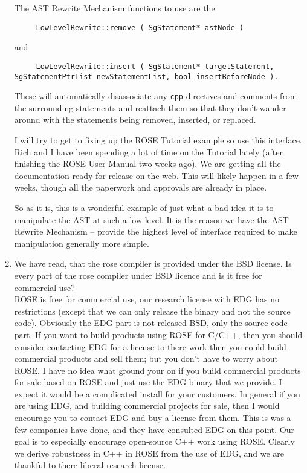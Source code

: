 \begin{enumerate}
The AST Rewrite Mechanism functions to use are the 
{\indent
{\mySmallFontSize
\begin{verbatim}
     LowLevelRewrite::remove ( SgStatement* astNode )
\end{verbatim}
}}
and 
{\indent
{\mySmallFontSize
\begin{verbatim}
     LowLevelRewrite::insert ( SgStatement* targetStatement, SgStatementPtrList newStatementList, bool insertBeforeNode ).
\end{verbatim}
}}

These will automatically disassociate any {\tt cpp} directives and comments
from the surrounding statements and reattach them so that they don't
wander around with the statements being removed, inserted, or replaced.

I will try to get to fixing up the ROSE Tutorial example so use this
interface.  Rich and I have been spending a lot of time on the Tutorial 
lately (after finishing the ROSE User Manual two weeks ago).  We are getting
all the documentation ready for release on the web.  This will likely 
happen in a few weeks, though all the paperwork and approvals are already
in place.

So as it is, this is a wonderful example of just what a bad idea it is
to manipulate the AST at such a low level.
It is the reason we have the AST Rewrite Mechanism -- provide the highest level
of interface required to make manipulation generally more simple.



\item  We have read, that the rose compiler is provided under the BSD license. Is every
    part of the rose compiler under BSD licence and is it free for commercial use? \\
   ROSE is free for commercial use, our research license with EDG has no
restrictions (except that we can only release the binary and not the source code).
Obviously the EDG part is not released BSD, only the source code part.
If you want to build products using ROSE for C/C++, then you should
consider contacting EDG for a license to there work then you could
build commercial products and sell them; but you don't have to worry
about ROSE.  I have no idea what ground your on if you build commercial
products for sale based on ROSE and just use the EDG binary
that we provide.  I expect it would be a complicated install for your customers. 
In general if you are using EDG, and building commercial projects for sale,
then I would encourage you to contact EDG and buy a license from them.
This is was a few companies have done, and they have consulted EDG on this
point.  Our goal is to especially encourage open-source C++ work using ROSE.
Clearly we derive robustness in C++ in ROSE from the use of EDG, and we
are thankful to there liberal research license.


\end{enumerate}
